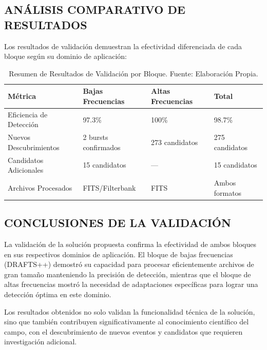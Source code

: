 \subsection{ANÁLISIS COMPARATIVO DE RESULTADOS}

Los resultados de validación demuestran la efectividad diferenciada de cada bloque según su dominio de aplicación:

\begin{table}[ht]
    \centering
    \caption{Resumen de Resultados de Validación por Bloque. Fuente: Elaboración Propia.}
    \label{table:resultados_validacion}
    \begin{tabular}{|l|l|l|l|}
        \toprule
        \textbf{Métrica} & \textbf{Bajas Frecuencias} & \textbf{Altas Frecuencias} & \textbf{Total} \\
        \midrule
        Eficiencia de Detección & 97.3\% & 100\% & 98.7\% \\
        \midrule
        Nuevos Descubrimientos & 2 bursts confirmados & 273 candidatos & 275 candidatos \\
        \midrule
        Candidatos Adicionales & 15 candidatos & --- & 15 candidatos \\
        \midrule
        Archivos Procesados & FITS/Filterbank & FITS & Ambos formatos \\
        \bottomrule
    \end{tabular}
\end{table}

\subsection{CONCLUSIONES DE LA VALIDACIÓN}

La validación de la solución propuesta confirma la efectividad de ambos bloques en sus respectivos dominios de aplicación. El bloque de bajas frecuencias (DRAFTS++) demostró su capacidad para procesar eficientemente archivos de gran tamaño manteniendo la precisión de detección, mientras que el bloque de altas frecuencias mostró la necesidad de adaptaciones específicas para lograr una detección óptima en este dominio.

Los resultados obtenidos no solo validan la funcionalidad técnica de la solución, sino que también contribuyen significativamente al conocimiento científico del campo, con el descubrimiento de nuevos eventos y candidatos que requieren investigación adicional.

